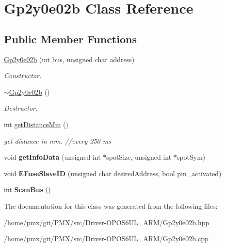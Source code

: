 \hypertarget{classGp2y0e02b}{}\section{Gp2y0e02b Class Reference}
\label{classGp2y0e02b}
\subsection*{Public Member Functions}
\begin{DoxyCompactItemize}
\item 
\mbox{\label{classGp2y0e02b_a3b3fe74d902e2b2d0447e9265c246ec6}} 
\hyperlink{classGp2y0e02b_a3b3fe74d902e2b2d0447e9265c246ec6}{Gp2y0e02b} (int bus, unsigned char address)
\begin{DoxyCompactList}\small\item\em Constructor. \end{DoxyCompactList}\item 
\mbox{\label{classGp2y0e02b_a8e18232e9001037642fc2292a0630ccc}} 
\hyperlink{classGp2y0e02b_a8e18232e9001037642fc2292a0630ccc}{$\sim$\+Gp2y0e02b} ()
\begin{DoxyCompactList}\small\item\em Destructor. \end{DoxyCompactList}\item 
\mbox{\label{classGp2y0e02b_a5bd1a340c7b3677c896602fe0e736d0e}} 
int \hyperlink{classGp2y0e02b_a5bd1a340c7b3677c896602fe0e736d0e}{get\+Distance\+Mm} ()
\begin{DoxyCompactList}\small\item\em get distance in mm. //every 250 ms \end{DoxyCompactList}\item 
\mbox{\label{classGp2y0e02b_a436a6b241732d37ee1e712b63033419a}} 
void {\bfseries get\+Info\+Data} (unsigned int $\ast$spot\+Size, unsigned int $\ast$spot\+Sym)
\item 
\mbox{\label{classGp2y0e02b_a9aadae2b11c00e1e4cac2c967fbd2336}} 
void {\bfseries E\+Fuse\+Slave\+ID} (unsigned char desired\+Address, bool pin\+\_\+activated)
\item 
\mbox{\label{classGp2y0e02b_addec1ee55e38f4b6fd7045034e17c46c}} 
int {\bfseries Scan\+Bus} ()
\end{DoxyCompactItemize}


The documentation for this class was generated from the following files\+:\begin{DoxyCompactItemize}
\item 
/home/pmx/git/\+P\+M\+X/src/\+Driver-\/\+O\+P\+O\+S6\+U\+L\+\_\+\+A\+R\+M/Gp2y0e02b.\+hpp\item 
/home/pmx/git/\+P\+M\+X/src/\+Driver-\/\+O\+P\+O\+S6\+U\+L\+\_\+\+A\+R\+M/Gp2y0e02b.\+cpp\end{DoxyCompactItemize}
